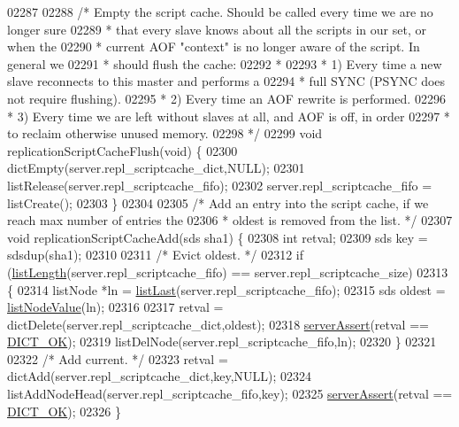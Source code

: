 \begin{DoxyCode}
{{{{{{{{{{{{{{{{{{{{{{{{{{{{{{{{{{{{{{{{{{{{{{{{{{{{{{{{{{{{{{{{{{{{{{{{{{{02287 
02288 \textcolor{comment}{/* Empty the script cache. Should be called every time we are no longer sure}
02289 \textcolor{comment}{ * that every slave knows about all the scripts in our set, or when the}
02290 \textcolor{comment}{ * current AOF "context" is no longer aware of the script. In general we}
02291 \textcolor{comment}{ * should flush the cache:}
02292 \textcolor{comment}{ *}
02293 \textcolor{comment}{ * 1) Every time a new slave reconnects to this master and performs a}
02294 \textcolor{comment}{ *    full SYNC (PSYNC does not require flushing).}
02295 \textcolor{comment}{ * 2) Every time an AOF rewrite is performed.}
02296 \textcolor{comment}{ * 3) Every time we are left without slaves at all, and AOF is off, in order}
02297 \textcolor{comment}{ *    to reclaim otherwise unused memory.}
02298 \textcolor{comment}{ */}
02299 \textcolor{keywordtype}{void} replicationScriptCacheFlush(\textcolor{keywordtype}{void}) \{
02300     dictEmpty(server.repl\_scriptcache\_dict,NULL);
02301     listRelease(server.repl\_scriptcache\_fifo);
02302     server.repl\_scriptcache\_fifo = listCreate();
02303 \}
02304 
02305 \textcolor{comment}{/* Add an entry into the script cache, if we reach max number of entries the}
02306 \textcolor{comment}{ * oldest is removed from the list. */}
02307 \textcolor{keywordtype}{void} replicationScriptCacheAdd(sds sha1) \{
02308     \textcolor{keywordtype}{int} retval;
02309     sds key = sdsdup(sha1);
02310 
02311     \textcolor{comment}{/* Evict oldest. */}
02312     \textcolor{keywordflow}{if} (\hyperlink{adlist_8h_afde0ab079f934670e82119b43120e94b}{listLength}(server.repl\_scriptcache\_fifo) == server.repl\_scriptcache\_size)
02313     \{
02314         listNode *ln = \hyperlink{adlist_8h_a5e0fad60032ef0fe9adcf9811e2f2fba}{listLast}(server.repl\_scriptcache\_fifo);
02315         sds oldest = \hyperlink{adlist_8h_af84cae230e7180ebcda1e2736fce9f65}{listNodeValue}(ln);
02316 
02317         retval = dictDelete(server.repl\_scriptcache\_dict,oldest);
02318         \hyperlink{server_8h_a88114b5169b4c382df6b56506285e56a}{serverAssert}(retval == \hyperlink{dict_8h_a2afecbeab8f7efbc183048f52f6d17e5}{DICT\_OK});
02319         listDelNode(server.repl\_scriptcache\_fifo,ln);
02320     \}
02321 
02322     \textcolor{comment}{/* Add current. */}
02323     retval = dictAdd(server.repl\_scriptcache\_dict,key,NULL);
02324     listAddNodeHead(server.repl\_scriptcache\_fifo,key);
02325     \hyperlink{server_8h_a88114b5169b4c382df6b56506285e56a}{serverAssert}(retval == \hyperlink{dict_8h_a2afecbeab8f7efbc183048f52f6d17e5}{DICT\_OK});
02326 \}
}}}}}}}}}}}}}}}}}}}}}}}}}}}}}}}}}}}}}}}}}}}}}}}}}}}}}}}}}}}}}}}}}}}}}}}}}}}
\end{DoxyCode}
